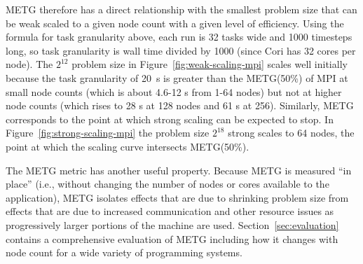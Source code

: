 METG therefore has a direct relationship with the smallest problem
size that can be weak scaled to a given node count with a given level
of efficiency. Using the formula for task granularity above, each run
is 32 tasks wide and 1000 timesteps long, so task granularity is wall
time divided by 1000 (since Cori has 32 cores per node). The $2^{12}$
problem size in Figure~\ref{fig:weak-scaling-mpi} scales well
initially because the task granularity of 20~\textmu{}s is greater
than the METG(50\%) of MPI at small node counts (which is about 4.6-12
\textmu{}s from 1-64 nodes) but not at higher node counts (which rises
to 28 \textmu{}s at 128 nodes and 61 \textmu{}s at 256). Similarly,
METG corresponds to the point at which strong scaling can be expected
to stop. In Figure~\ref{fig:strong-scaling-mpi} the problem size
$2^{18}$ strong scales to 64 nodes, the point at which the
scaling curve intersects METG(50\%).

The METG metric has another useful property. Because METG is measured ``in place'' (i.e.,
without changing the number of nodes or cores available to the
application), METG isolates effects that are
due to shrinking problem size from effects that are due to
increased communication and other resource issues as
progressively larger portions of the machine are used. Section~\ref{sec:evaluation} contains a comprehensive evaluation of
METG including how it changes with node count for a wide variety of
programming systems.
